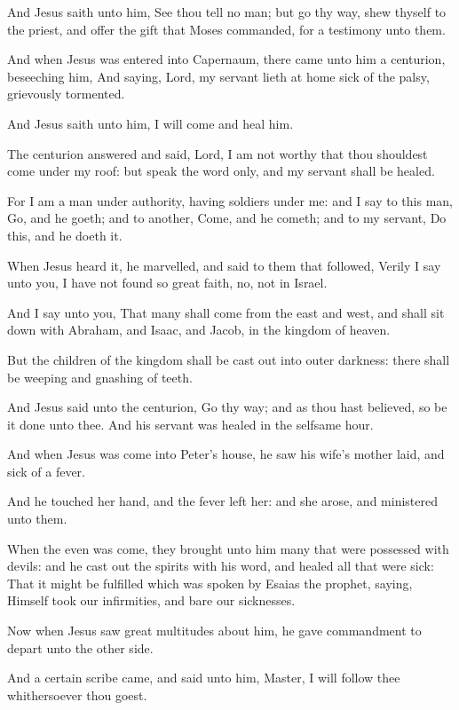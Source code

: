 \verse And Jesus saith unto him, See thou tell no man; but go thy way, shew thyself to the priest, and offer the gift that Moses commanded, for a testimony unto them.

\verse And when Jesus was entered into Capernaum, there came unto him a centurion, beseeching him, \verse And saying, Lord, my servant lieth at home sick of the palsy, grievously tormented.

\verse And Jesus saith unto him, I will come and heal him.

\verse The centurion answered and said, Lord, I am not worthy that thou shouldest come under my roof: but speak the word only, and my servant shall be healed.

\verse For I am a man under authority, having soldiers under me: and I say to this man, Go, and he goeth; and to another, Come, and he cometh; and to my servant, Do this, and he doeth it.

\verse When Jesus heard it, he marvelled, and said to them that followed, Verily I say unto you, I have not found so great faith, no, not in Israel.

\verse And I say unto you, That many shall come from the east and west, and shall sit down with Abraham, and Isaac, and Jacob, in the kingdom of heaven.

\verse But the children of the kingdom shall be cast out into outer darkness: there shall be weeping and gnashing of teeth.

\verse And Jesus said unto the centurion, Go thy way; and as thou hast believed, so be it done unto thee. And his servant was healed in the selfsame hour.

\verse And when Jesus was come into Peter's house, he saw his wife's mother laid, and sick of a fever.

\verse And he touched her hand, and the fever left her: and she arose, and ministered unto them.

\verse When the even was come, they brought unto him many that were possessed with devils: and he cast out the spirits with his word, and healed all that were sick: \verse That it might be fulfilled which was spoken by Esaias the prophet, saying, Himself took our infirmities, and bare our sicknesses.

\verse Now when Jesus saw great multitudes about him, he gave commandment to depart unto the other side.

\verse And a certain scribe came, and said unto him, Master, I will follow thee whithersoever thou goest.

